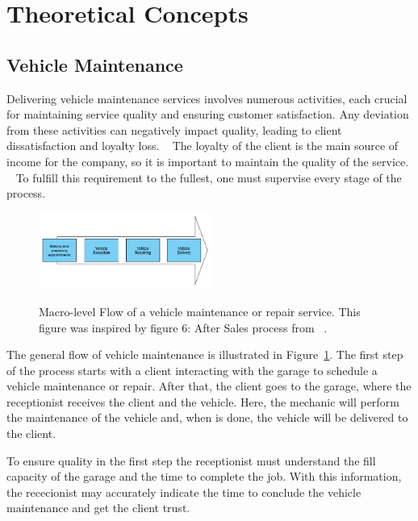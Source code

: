 \section{Theoretical Concepts}

\subsection{Vehicle Maintenance}

Delivering vehicle maintenance services involves numerous activities, each crucial for maintaining service quality and ensuring customer satisfaction. 
Any deviation from these activities can negatively impact quality, leading to client dissatisfaction and loyalty loss. ~\cite{Setting_the_after_sale_process}
The loyalty of the client is the main source of income for the company, so it is important to maintain the quality of the service. ~\cite{Setting_the_after_sale_process}
To fulfill this requirement to the fullest, one must supervise every stage of the process. ~\cite{Setting_the_after_sale_process}


\begin{figure}[h]
  \caption{Macro-level Flow of a vehicle maintenance or repair service. This figure was inspired by figure 6: After Sales process from ~\citet{Setting_the_after_sale_process}.}
  \centering
  \includegraphics[width=0.50\textwidth]{figs/Vehicle_maintenace_macro}
  \label{fig:Vehicle_maintenace_macro}
\end{figure}

The general flow of vehicle maintenance is illustrated in Figure~\ref{fig:Vehicle_maintenace_macro}. 
The first step of the process starts with a client interacting with the garage to schedule a vehicle maintenance or repair. 
After that, the client goes to the garage, where the receptionist receives the client and the vehicle.
Here, the mechanic will perform the maintenance of the vehicle and, when is done, the vehicle will be delivered to the client.

To ensure quality in the first step the receptionist must understand the fill capacity of the garage and the time to complete the job. 
With this information, the rececionist may accurately indicate the time to conclude the vehicle maintenance and get the client trust. ~\cite{Setting_the_after_sale_process}

